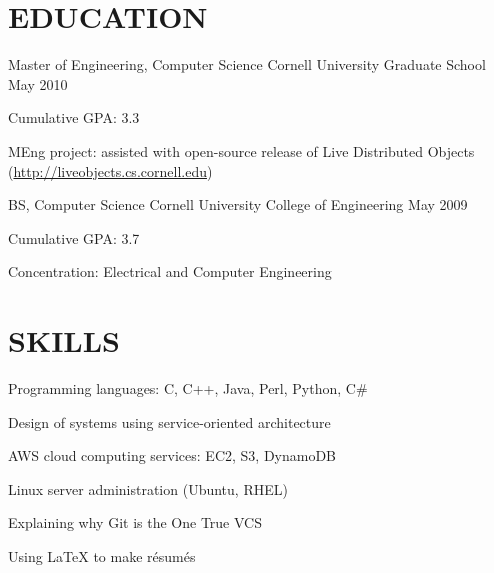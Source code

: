 \documentclass{res}
\begin{document}
\begin{resume}
\section{{\large E}DUCATION}

\affiliation
	{Master of Engineering, Computer Science}
	{Cornell University Graduate School}
	{May 2010}
	\begin{pos}
	\item Cumulative GPA: 3.3
	\item MEng project: assisted with open-source release of Live Distributed Objects
		(\url{http://liveobjects.cs.cornell.edu})
	\end{pos}

\affiliation
	{BS, Computer Science}
	{Cornell University College of Engineering}
	{May 2009}
	\begin{pos}
	\item Cumulative GPA: 3.7
	\item Concentration: Electrical and Computer Engineering
	\end{pos}


\section{{\large S}KILLS}
	\vspace{10pt}
	\begin{compactitem}
	\item Programming languages: C, C++, Java, Perl, Python, C\#
	\item Design of systems using service-oriented architecture
	\item AWS cloud computing services: EC2, S3, DynamoDB
	\item Linux server administration (Ubuntu, RHEL)
	\item Explaining why Git is the One True VCS
	\item Using \LaTeX{} to make r\'esum\'es
	\end{compactitem}

\end{resume}
\end{document}
